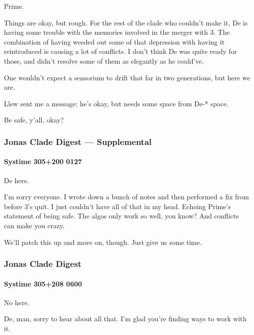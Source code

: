 Prime.

Things are okay, but rough. For the rest of the clade who couldn't make it, De is having some trouble with the memories involved in the merger with 3. The combination of having weeded out some of that depression with having it reintroduced is causing a lot of conflicts. I don't think De was quite ready for those, and didn't resolve some of them as elegantly as he could've.

One wouldn't expect a sensorium to drift that far in two generations, but here we are.

Llew sent me a message; he's okay, but needs some space from De-* space.

Be safe, y'all, okay?

\hypertarget{jonas-clade-digest-supplemental-8}{%
\subsubsection{Jonas Clade Digest --- Supplemental}\label{jonas-clade-digest-supplemental-8}}

\hypertarget{systime-305200-0127}{%
\paragraph{Systime 305+200 0127}\label{systime-305200-0127}}

De here.

I'm sorry everyone. I wrote down a bunch of notes and then performed a fix from before 3's quit. I just couldn't have all of that in my head. Echoing Prime's statement of being safe. The algos only work so well, you know? And conflicts can make you crazy.

We'll patch this up and move on, though. Just give us some time.

\hypertarget{jonas-clade-digest-4}{%
\subsubsection{Jonas Clade Digest}\label{jonas-clade-digest-4}}

\hypertarget{systime-305208-0600}{%
\paragraph{Systime 305+208 0600}\label{systime-305208-0600}}

No here.

De, man, sorry to hear about all that. I'm glad you're finding ways to work with it.


